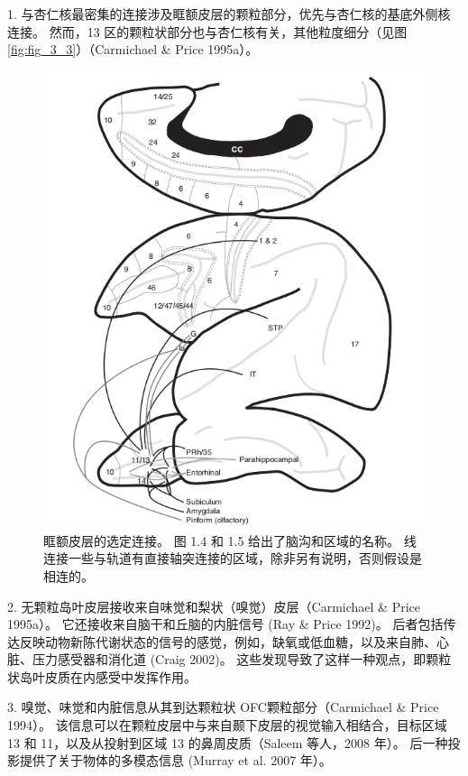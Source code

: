 1. 与杏仁核最密集的连接涉及眶额皮层的颗粒部分，优先与杏仁核的基底外侧核连接。
然而，13 区的颗粒状部分也与杏仁核有关，其他粒度细分（见图 \ref{fig:fig_3_3}）（Carmichael \& Price 1995a）。\par


\begin{figure}[!htb]
	\centering
	\includegraphics{image_pfc/Fig_4_2}
	\caption{眶额皮层的选定连接。 图 1.4 和 1.5 给出了脑沟和区域的名称。 线连接一些与轨道有直接轴突连接的区域，除非另有说明，否则假设是相连的。}\label{fig:fig_4_2}
\end{figure}


2. 无颗粒岛叶皮层接收来自味觉和梨状（嗅觉）皮层（Carmichael \& Price 1995a）。
它还接收来自脑干和丘脑的内脏信号 (Ray \& Price 1992)。
后者包括传达反映动物新陈代谢状态的信号的感觉，例如，缺氧或低血糖，以及来自肺、心脏、压力感受器和消化道 (Craig 2002)。
这些发现导致了这样一种观点，即颗粒状岛叶皮质在内感受中发挥作用。\par


3. 嗅觉、味觉和内脏信息从其到达颗粒状 OFC颗粒部分（Carmichael \& Price 1994）。
该信息可以在颗粒皮层中与来自颞下皮层的视觉输入相结合，目标区域 13 和 11，以及从投射到区域 13 的鼻周皮质（Saleem 等人，2008 年）。
后一种投影提供了关于物体的多模态信息 (Murray et al.
2007 年）。\par


